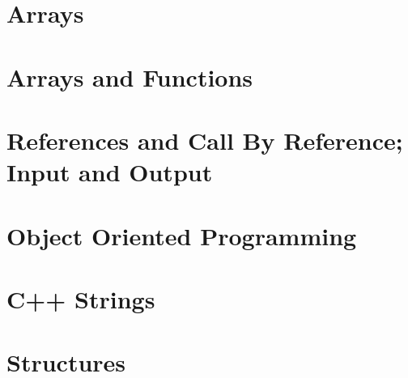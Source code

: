 \documentclass{report}
\begin{document}
    \section{Arrays}
    \pagebreak \bigbreak \noidennt

    \section{Arrays and Functions}
    \pagebreak \bigbreak \noidennt

    \section{References and Call By Reference; Input and Output}
    \pagebreak \bigbreak \noidennt

    \section{Object Oriented Programming}
    \pagebreak \bigbreak \noidennt

    \section{C++ Strings}
    \pagebreak \bigbreak \noidennt

    \section{Structures}
    \pagebreak \bigbreak \noindent 

    
\end{document}
